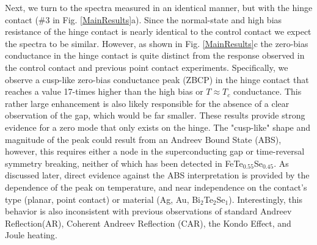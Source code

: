 Next, we turn to the spectra measured in an identical manner, but with the hinge contact (\#3 in Fig. \ref{MainResults}a). Since the normal-state and high bias resistance of the hinge contact is nearly identical to the control contact we expect the spectra to be similar. However, as shown in Fig. \ref{MainResults}c the zero-bias conductance in the hinge contact is quite distinct from the response observed in the control contact and previous point contact experiments. Specifically, we observe a cusp-like zero-bias conductance peak (ZBCP) in the hinge contact that reaches a value 17-times higher than the high bias or $T\approx T_{c}$ conductance. This rather large enhancement is also likely responsible for the absence of a clear observation of the gap, which would be far smaller. These results provide strong evidence for a zero mode that only exists on the hinge. The "cusp-like" shape and magnitude of the peak could result from an Andreev Bound State (ABS)\cite{Deutscher2005,Sinha1998,Greene1999}, however, this requires either a node in the superconducting gap or time-reversal symmetry breaking,\cite{Yakovenko2002,TanakaTopSym2012} neither of which has been detected in FeTe$_{0.55}$Se$_{0.45}$\cite{Serafin2010,Zeng2010,Bendele2010,Okazaki2012,Miao2012,Kim2010,Hanaguri2010}. As discussed later, direct evidence against the ABS interpretation is provided by the dependence of the peak on temperature, and near independence on the contact's type (planar, point contact) or material (Ag, Au, Bi$_{2}$Te$_{2}$Se$_{1}$). Interestingly, this behavior is also inconsistent with previous observations of standard Andreev Reflection(AR)\cite{Tanaka2003}, Coherent Andreev Reflection (CAR)\cite{Klapwijk1992}, the Kondo Effect\cite{Sasaki2000,Samokhin2001}, and Joule heating\cite{Naidyuk2018}. 

